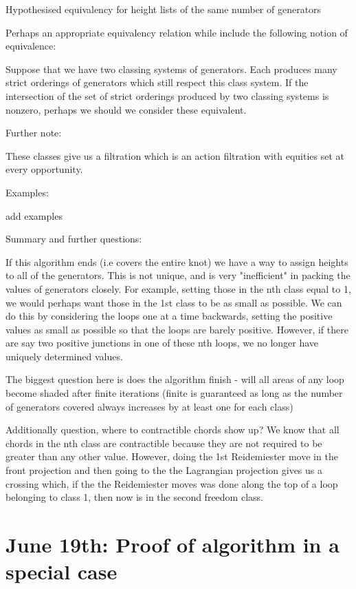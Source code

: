 \documentclass[11pt]{amsart}
\begin{document}
Hypothesised equivalency for height lists of the same number of generators

Perhaps an appropriate equivalency relation while include the following notion of equivalence:

Suppose that we have two classing systems of generators. Each produces many strict orderings of generators which still respect this class system. If the intersection of the set of strict orderings produced by two classing systems is nonzero, perhaps we should we consider these equivalent.




Further note:

These classes give us a filtration which is an action filtration with equities set at every opportunity. 

Examples:

add examples

Summary and further questions:

If this algorithm ends (i.e covers the entire knot) we have a way to assign heights to all of the generators. This is not unique, and is very "inefficient" in packing the values of generators closely. For example, setting those in the nth class equal to 1, we would perhaps want those in the 1st class to be as small as possible. We can do this by considering the loops one at a time backwards, setting the positive values as small as possible so that the loops are barely positive. However, if there are say two positive junctions in one of these nth loops, we no longer have uniquely determined values. 

The biggest question here is does the algorithm finish - will all areas of any loop become shaded after finite iterations (finite is guaranteed as long as the number of generators covered always increases by at least one for each class)

Additionally question, where to contractible chords show up? We know that all chords in the nth class are contractible because they are not required to be greater than any other value. However, doing the 1st Reidemiester move in the front projection and then going to the the Lagrangian projection gives us a crossing which, if the the Reidemiester moves was done along the top of a loop belonging to class 1, then now is in the second freedom class. 




\section{June 19th: Proof of algorithm in a special case}
\end{document}
